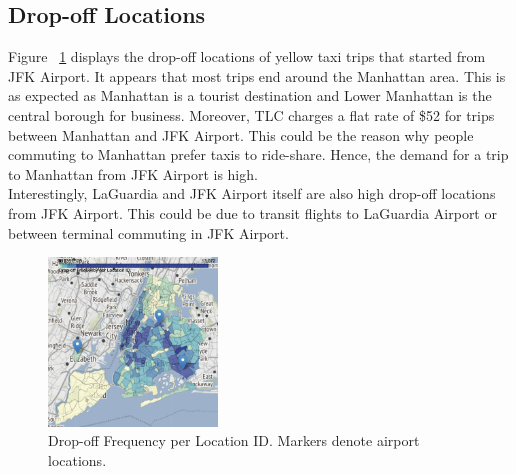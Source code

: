 \documentclass[11pt]{article}
\begin{document}
\subsection{Drop-off Locations}
Figure ~\ref{fig:geo} displays the drop-off locations of yellow taxi trips that started from JFK Airport. It appears that most trips end around the Manhattan area. This is as expected as Manhattan is a tourist destination and Lower Manhattan is the central borough for business. Moreover, TLC charges a flat rate of \$52 for trips between Manhattan and JFK Airport. This could be the reason why people commuting to Manhattan prefer taxis to ride-share. Hence, the demand for a trip to Manhattan from JFK Airport is high.
\\
Interestingly, LaGuardia and JFK Airport itself are also high drop-off locations from JFK Airport. This could be due to transit flights to LaGuardia Airport or between terminal commuting in JFK Airport.
\begin{figure}[h]
    \includegraphics[width=0.4\textwidth]{plots/geospatial_vis.png}
    \centering
    \caption{Drop-off Frequency per Location ID. Markers denote airport locations.} 
    \label{fig:geo}
\end{figure}
\end{document}
